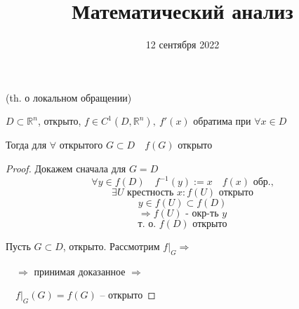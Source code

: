 

\DeclareMathOperator{\Kerr}{Ker}
\DeclareMathOperator{\Imm}{Im}
\DeclareMathOperator{\Int}{Int}
\DeclareMathOperator{\Mat}{Mat}
\DeclareMathOperator{\rank}{rank}
\DeclareMathOperator*{\id}{id}
\renewcommand{\phi}{\varphi}
\renewcommand{\theta}{\vartheta}
\renewcommand{\epsilon}{\varepsilon}
\newcommand{\R}{\mathbb{R}}
\renewcommand{\C}{\mathbb{C}}


    \title{Математический анализ}
    \date{12 сентября 2022}
    \maketitle{}

    \pagebreak

    \begin{corollary}
        (th. о локальном обращении)
        \par $D \subset \R^n$,  открыто, $f \in C^1(D, \R^n), \ f'(x)$ обратима при $\forall x \in D$
        \par Тогда для $\forall$ открытого $G \subset D \quad f(G)$ открыто
    \end{corollary}
    \begin{proof}
        Докажем сначала для $G = D$
        \[ \forall y \in f(D) \quad f^{-1}(y) := x \quad f(x) \text{ обр.,} \]
        \[ \exists U \text{ крестность } x : f(U) \text{ открыто} \]
        \[ y \in f(U) \subset f(D) \]
        \[ \Rightarrow f(U) \text{ - окр-ть } y \]
        \[\text{т. о. } f(D) \text{ открыто}\]
        \par Пусть $G \subset D$, открыто. Рассмотрим $f\big|_G \Rightarrow$
        \par $\quad \Rightarrow$ принимая доказанное $\Rightarrow$
        \par $\quad f\big|_G(G) = f(G)$ -- открыто
    \end{proof}

